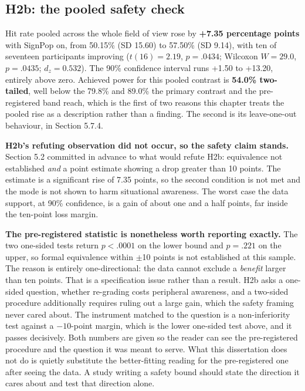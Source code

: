 \subsection{H2b: the pooled safety check}

Hit rate pooled across the whole field of view rose by \textbf{+7.35 percentage points} with SignPop
on, from 50.15\% (SD 15.60) to 57.50\% (SD 9.14), with ten of seventeen participants improving
($t(16) = 2.19$, $p = .0434$; Wilcoxon $W = 29.0$, $p = .0435$; $d_z = 0.532$). The 90\% confidence
interval runs +1.50 to +13.20, entirely above zero. Achieved power for this pooled contrast is
\textbf{54.0\% two-tailed}, well below the 79.8\% and 89.0\%
the primary contrast and the pre-registered band reach, which is the first of two reasons this
chapter treats the pooled rise as a description rather than a finding. The second is its
leave-one-out behaviour, in Section 5.7.4.

\textbf{H2b's refuting observation did not occur, so the safety claim stands.} Section 5.2 committed
in advance to what would refute H2b: equivalence not established \textit{and} a point estimate
showing a drop greater than 10 points. The estimate is a significant rise of 7.35 points, so the
second condition is not met and the mode is not shown to harm situational awareness. The worst case
the data support, at 90\% confidence, is a gain of about one and a half points, far inside the
ten-point loss margin.

\textbf{The pre-registered statistic is nonetheless worth reporting exactly.} The two one-sided
tests return $p < .0001$ on the lower bound and $p = .221$ on the upper, so formal equivalence within
$\pm$10 points is not established at this sample. The reason is entirely one-directional: the data
cannot exclude a \textit{benefit} larger than ten points. That is a specification issue rather than a
result. H2b asks a one-sided question, whether re-grading costs peripheral awareness, and a two-sided
procedure additionally requires ruling out a large gain, which the safety framing never cared about.
The instrument matched to the question is a non-inferiority test against a $-10$-point margin, which
is the lower one-sided test above, and it passes decisively. Both numbers are given so the reader can
see the pre-registered procedure and the question it was meant to serve. What this dissertation does
not do is quietly substitute the better-fitting reading for the pre-registered one after seeing the
data. A study writing a safety bound should state the direction it cares about and test that
direction alone.

